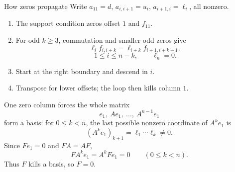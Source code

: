 \documentclass{beamer}
\begin{document}
\begin{frame}{How zeros propagate}
Write $a_{11}=d$, $a_{i,i+1}=u_i$, $a_{i+1,i}=\ell_i$, all nonzero.
\begin{enumerate}
\item The support condition zeros offset $1$ and $f_{11}$.
\item For odd $k\geq3$, commutation and smaller odd zeros give
\[
 \ell_i f_{i,i+k}=\ell_{i+k}f_{i+1,i+k+1},
\]
\[
 1\leq i\leq n-k,\qquad \ell_n=0.
\]
\item Start at the right boundary and descend in $i$.
\item Transpose for lower offsets; the loop then kills column $1$.
\end{enumerate}
\end{frame}
\begin{frame}{One zero column forces the whole matrix}
\[
 e_1,\ Ae_1,\ \ldots,\ A^{n-1}e_1
\]
form a basis: for $0\leq k<n$, the last possible nonzero coordinate of $A^ke_1$ is
\[
 (A^ke_1)_{k+1}=\ell_1\cdots\ell_k\ne0.
\]
Since $Fe_1=0$ and $FA=AF$,
\[
 FA^ke_1=A^kFe_1=0\qquad(0\leq k<n).
\]
Thus $F$ kills a basis, so $F=0$.
\end{frame}
\end{document}
